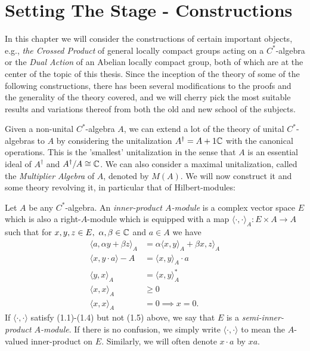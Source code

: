 \chapter{Setting The Stage - Constructions}
In this chapter we will consider the constructions of certain important objects, e.g., \emph{the Crossed Product} of general locally compact groups acting on a $C^*$-algebra or the \emph{Dual Action} of an Abelian locally compact group, both of which are at the center of the topic of this thesis. Since the inception of the theory of some of the following constructions, there has been several modifications to the proofs and the generality of the theory covered, and we will cherry pick the most suitable results and variations thereof from both the old and new school of the subjects.

Given a non-unital $C^*$-algebra $A$, we can extend a lot of the theory of unital $C^*$-algebras to $A$ by considering the unitalization $A^\dagger = A + 1\mathbb{C}$ with the canonical operations. This is the 'smallest' unitalization in the sense that $A$ is an  essential ideal of $A^\dagger$ and $A^\dagger/A \cong \mathbb{C}$. We can also consider a maximal unitalization, called the \emph{Multiplier Algebra} of $A$, denoted by $M(A)$. We will now construct it and some theory revolving it, in particular that of Hilbert-modules:
\begin{definition}
	Let $A$ be any $C^*$-algebra. An \emph{inner-product $A$-module} is a complex vector space $E$ which is also a right-$A$-module which is equipped with a map $\langle \cdot, \cdot\rangle_A \colon E \times A \to A$ such that for $x,y,z \in E, \ \alpha,\beta \in \mathbb{C}$ and $a \in A$ we have
	\begin{align}
		\langle a , \alpha y + \beta z \rangle_A &= \alpha \langle x,y\rangle_A+\beta x,z \rangle_A\\
		\langle x , y \cdot a \rangle-A &= \langle x,y\rangle_A \cdot a\\
		\langle y,x \rangle_A &= \langle x,y\rangle_A^*\\
		\langle x,x \rangle_A &\geq 0\\
		\langle x,x \rangle_A &= 0 \implies x = 0. 
	\end{align}
	If $\langle \cdot , \cdot \rangle$ satisfy (1.1)-(1.4) but not (1.5) above, we say that $E$ is a \emph{semi-inner-product $A$-module}. If there is no confusion, we simply write $\langle \cdot, \cdot \rangle$ to mean the $A$-valued inner-product on $E$. Similarly, we will often denote $x \cdot a$ by $xa$.
\end{definition}
